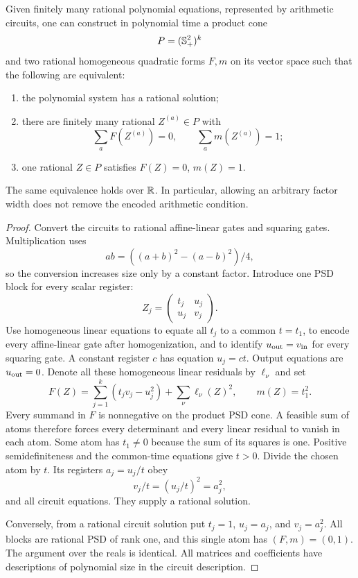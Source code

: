 \begin{theorem}\label{thm:universal}
Given finitely many rational polynomial equations, represented by arithmetic circuits, one can construct in polynomial time a product cone
\[
 P=(\mathbb S_+^2)^k
\]
and two rational homogeneous quadratic forms $F,m$ on its vector space such that the following are equivalent:
\begin{enumerate}
\item the polynomial system has a rational solution;
\item there are finitely many rational $Z^{(a)}\in P$ with
\[
 \sum_a F(Z^{(a)})=0,\qquad \sum_a m(Z^{(a)})=1;
\]
\item one rational $Z\in P$ satisfies $F(Z)=0$, $m(Z)=1$.
\end{enumerate}
The same equivalence holds over $\mathbb R$. In particular, allowing an arbitrary factor width does not remove the encoded arithmetic condition.
\end{theorem}
\begin{proof}
Convert the circuits to rational affine-linear gates and squaring gates. Multiplication uses
\[
 ab=((a+b)^2-(a-b)^2)/4,
\]
so the conversion increases size only by a constant factor. Introduce one PSD block for every scalar register:
\[
 Z_j=\begin{pmatrix}t_j&u_j\\u_j&v_j\end{pmatrix}.
\]
Use homogeneous linear equations to equate all $t_j$ to a common $t=t_1$, to encode every affine-linear gate after homogenization, and to identify $u_{\rm out}=v_{\rm in}$ for every squaring gate. A constant register $c$ has equation $u_j=ct$. Output equations are $u_{\rm out}=0$. Denote all these homogeneous linear residuals by $\ell_\nu$ and set
\[
 F(Z)=\sum_{j=1}^k(t_jv_j-u_j^2)+\sum_\nu\ell_\nu(Z)^2,
 \qquad m(Z)=t_1^2.
\]
Every summand in $F$ is nonnegative on the product PSD cone. A feasible sum of atoms therefore forces every determinant and every linear residual to vanish in each atom. Some atom has $t_1\ne0$ because the sum of its squares is one. Positive semidefiniteness and the common-time equations give $t>0$. Divide the chosen atom by $t$. Its registers $a_j=u_j/t$ obey
\[
 v_j/t=(u_j/t)^2=a_j^2,
\]
and all circuit equations. They supply a rational solution.

Conversely, from a rational circuit solution put $t_j=1$, $u_j=a_j$, and $v_j=a_j^2$. All blocks are rational PSD of rank one, and this single atom has $(F,m)=(0,1)$. The argument over the reals is identical. All matrices and coefficients have descriptions of polynomial size in the circuit description.
\end{proof}
